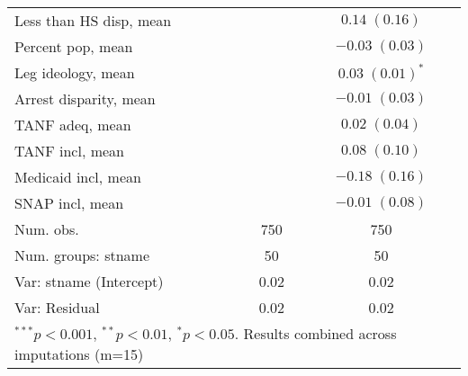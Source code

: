 \begin{table}
\begin{center}
\begin{tabular}{l c c }
Less than HS disp, mean    &                         & $0.14 \; (0.16)$        \\
Percent pop, mean          &                         & $-0.03 \; (0.03)$       \\
Leg ideology, mean         &                         & $0.03 \; (0.01)^{*}$    \\
Arrest disparity, mean     &                         & $-0.01 \; (0.03)$       \\
TANF adeq, mean            &                         & $0.02 \; (0.04)$        \\
TANF incl, mean            &                         & $0.08 \; (0.10)$        \\
Medicaid incl, mean        &                         & $-0.18 \; (0.16)$       \\
SNAP incl, mean            &                         & $-0.01 \; (0.08)$       \\
\hline
Num. obs.                  & 750                     & 750                     \\
Num. groups: stname        & 50                      & 50                      \\
Var: stname (Intercept)    & 0.02                    & 0.02                    \\
Var: Residual              & 0.02                    & 0.02                    \\
\hline
\multicolumn{3}{l}{\scriptsize{$^{***}p<0.001$, $^{**}p<0.01$, $^*p<0.05$. Results combined across imputations (m=15)}}
\end{tabular}
\label{table:coefficients}
\end{center}
\end{table}
